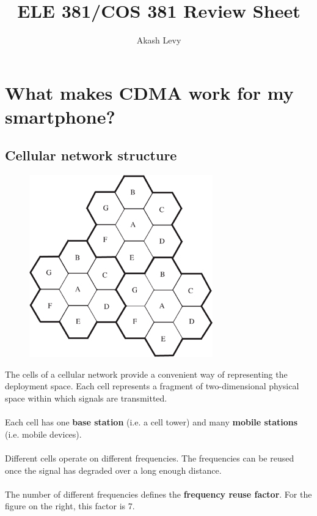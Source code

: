 \documentclass{article}
\title{ELE 381/COS 381 Review Sheet}
\author{Akash Levy}
\begin{document}
\maketitle

\section{What makes CDMA work for my smartphone?}

\subsection{Cellular network structure}

\begin{figure}
\includegraphics[width=\linewidth]{freq_reuse.png}
\end{figure}

The cells of a cellular network provide a convenient way of representing the deployment space. Each cell represents a fragment of two-dimensional physical space within which signals are transmitted. \\
\\
Each cell has one \textbf{base station} (i.e. a cell tower) and many \textbf{mobile stations} (i.e. mobile devices). \\
\\
Different cells operate on different frequencies. The frequencies can be reused once the signal has degraded over a long enough distance. \\
\\
The number of different frequencies defines the \textbf{frequency reuse factor}. For the figure on the right, this factor is 7. \\
\end{document}
